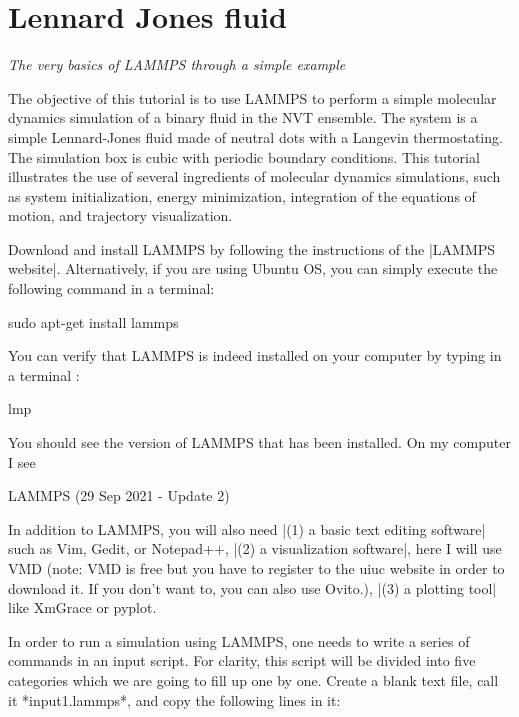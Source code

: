 \chapter{Lennard Jones fluid}

\vspace{-1cm} \noindent \textcolor{graytitle}{\textit{{\Large The very basics of LAMMPS through a simple example}}\vspace{0.5cm} }



The objective of this tutorial is to use
LAMMPS to perform a simple molecular dynamics simulation
of a binary fluid in the NVT ensemble. The system is a simple Lennard-Jones fluid
made of neutral dots with a Langevin thermostating. The
simulation box is cubic with periodic boundary conditions.
This tutorial illustrates the use of several ingredients of
molecular dynamics simulations, such as system initialization,
energy minimization, integration of the equations of motion,
and trajectory visualization.

Download and install LAMMPS by following the instructions of the |LAMMPS website|.
Alternatively, if you are using Ubuntu OS, you can simply execute the
following command in a terminal:

\begin{lcverbatim}
sudo apt-get install lammps
\end{lcverbatim}

You can verify that LAMMPS is indeed installed on your
computer by typing in a terminal :

\begin{lcverbatim}
lmp
\end{lcverbatim}

You should see the version of LAMMPS that has been
installed. On my computer I see

\begin{lcverbatim}
LAMMPS (29 Sep 2021 - Update 2)
\end{lcverbatim}

In addition to LAMMPS, you will also need |(1) a basic text editing software|
such as Vim, Gedit, or Notepad++, |(2) a visualization software|, here I
will use VMD (note: VMD is free but you have to register to
the uiuc website in order to download it. If you don't want
to, you can also use Ovito.), |(3) a plotting tool| like
XmGrace or pyplot.

In order to run a simulation using LAMMPS, one needs to
write a series of commands in an input script. For clarity,
this script will be divided into five categories which we are going to
fill up one by one. Create a blank text file, call it
*input1.lammps*, and copy the following lines in it:

